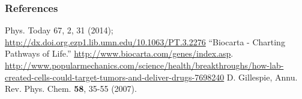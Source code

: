 \documentclass[xcolor={usenames,dvipsnames,svgnames},url=hyphens]{beamer}
\begin{document}
\appendix

\begin{frame}
    \frametitle{References}
    \begin{thebibliography}{9}
         Phys. Today 67, 2, 31 (2014); \url{http://dx.doi.org.ezp1.lib.umn.edu/10.1063/PT.3.2276}
         ``Biocarta - Charting Pathways of Life.'' \url{http://www.biocarta.com/genes/index.asp}.
         \url{http://www.popularmechanics.com/science/health/breakthroughs/how-lab-created-cells-could-target-tumors-and-deliver-drugs-7698240}
         D. Gillespie, Annu. Rev. Phys. Chem. \textbf{58}, 35-55 (2007).
    \end{thebibliography}
\end{frame}
\end{document}
